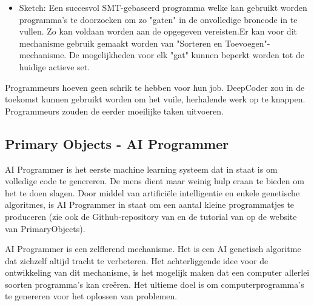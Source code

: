 \begin{description}
\begin{itemize}
		\item Sketch: Een succesvol SMT-gebaseerd programma welke kan gebruikt worden programma's te doorzoeken om zo "gaten" in de onvolledige broncode in te vullen. Zo kan voldaan worden aan de opgegeven vereisten.Er kan voor dit mechanisme gebruik gemaakt worden van "Sorteren en Toevoegen"-mechanisme. De mogelijkheden voor elk "gat" kunnen beperkt worden tot de huidige actieve set.
	\end{itemize}
\end{description}

Programmeurs hoeven geen schrik te hebben voor hun job. DeepCoder zou in de toekomst kunnen gebruikt worden om het vuile, herhalende werk op te knappen. Programmeurs zouden de eerder moeilijke taken uitvoeren.

\subsection{Primary Objects - AI Programmer}

AI Programmer is het eerste machine learning systeem dat in staat is om volledige code te genereren. De mens dient maar weinig hulp eraan te bieden om het te doen slagen. Door middel van artificiële intelligentie en enkele genetische algoritmes, is AI Programmer in staat om een aantal kleine programmatjes te produceren (zie ook de Github-repository van \textcite{github} en de tutorial van \textcite{primaryObject} op de website van PrimaryObjects).

AI Programmer is een zelflerend mechanisme. Het is een AI genetisch algoritme dat zichzelf altijd tracht te verbeteren. Het achterliggende idee voor de ontwikkeling van dit mechanisme, is het mogelijk maken dat een computer allerlei soorten programma's kan creëren. Het ultieme doel is om computerprogramma’s te genereren voor het oplossen van problemen.

